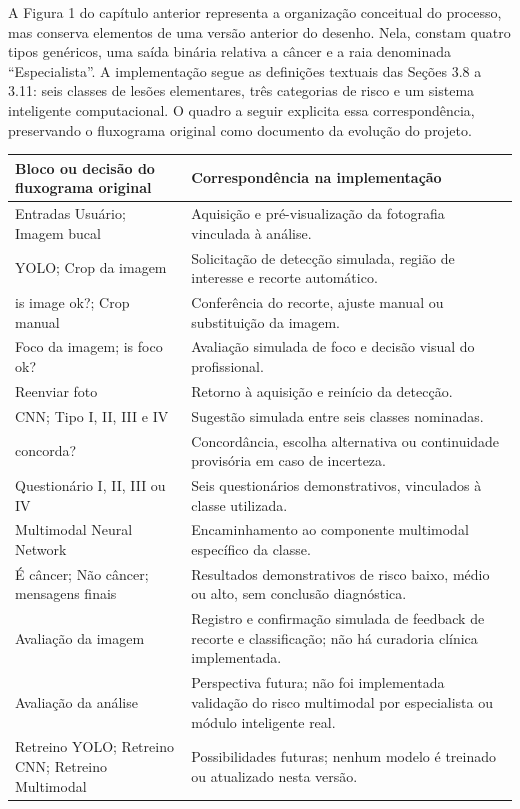 A Figura 1 do capítulo anterior representa a organização conceitual do processo, mas conserva elementos de uma versão anterior do desenho. Nela, constam quatro tipos genéricos, uma saída binária relativa a câncer e a raia denominada “Especialista”. A implementação segue as definições textuais das Seções 3.8 a 3.11: seis classes de lesões elementares, três categorias de risco e um sistema inteligente computacional. O quadro a seguir explicita essa correspondência, preservando o fluxograma original como documento da evolução do projeto.

\begingroup\small
\begin{longtable}{p{}p{}}
\hline
\textbf{Bloco ou decisão do fluxograma original} & \textbf{Correspondência na implementação} \\
\hline\endhead
Entradas Usuário; Imagem bucal & Aquisição e pré-visualização da fotografia vinculada à análise. \\
YOLO; Crop da imagem & Solicitação de detecção simulada, região de interesse e recorte automático. \\
is image ok?; Crop manual & Conferência do recorte, ajuste manual ou substituição da imagem. \\
Foco da imagem; is foco ok? & Avaliação simulada de foco e decisão visual do profissional. \\
Reenviar foto & Retorno à aquisição e reinício da detecção. \\
CNN; Tipo I, II, III e IV & Sugestão simulada entre seis classes nominadas. \\
concorda? & Concordância, escolha alternativa ou continuidade provisória em caso de incerteza. \\
Questionário I, II, III ou IV & Seis questionários demonstrativos, vinculados à classe utilizada. \\
Multimodal Neural Network & Encaminhamento ao componente multimodal específico da classe. \\
É câncer; Não câncer; mensagens finais & Resultados demonstrativos de risco baixo, médio ou alto, sem conclusão diagnóstica. \\
Avaliação da imagem & Registro e confirmação simulada de feedback de recorte e classificação; não há curadoria clínica implementada. \\
Avaliação da análise & Perspectiva futura; não foi implementada validação do risco multimodal por especialista ou módulo inteligente real. \\
Retreino YOLO; Retreino CNN; Retreino Multimodal & Possibilidades futuras; nenhum modelo é treinado ou atualizado nesta versão. \\
\hline\end{longtable}
\endgroup
